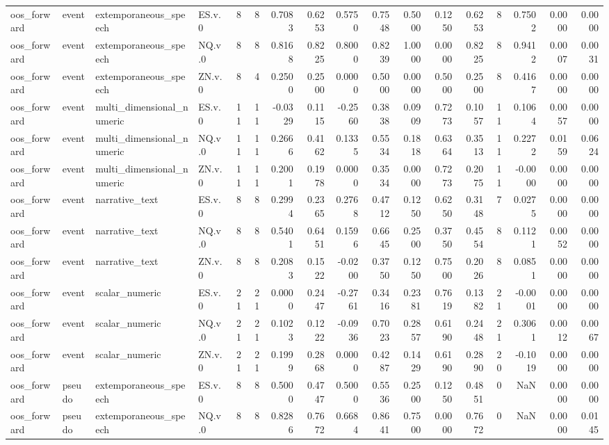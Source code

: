 \begin{tabular}{llllrrrrrrrrrrrrr}
oos_forward & event & extemporaneous_speech & ES.v.0 & 8 & 8 & 0.7083 & 0.6253 & 0.5750 & 0.7548 & 0.5000 & 0.1250 & 0.6253 & 8 & 0.7502 & 0.0000 & 0.0000 \\
oos_forward & event & extemporaneous_speech & NQ.v.0 & 8 & 8 & 0.8168 & 0.8225 & 0.8000 & 0.8239 & 1.0000 & 0.0000 & 0.8225 & 8 & 0.9412 & 0.0007 & 0.0031 \\
oos_forward & event & extemporaneous_speech & ZN.v.0 & 8 & 4 & 0.2500 & 0.2500 & 0.0000 & 0.5000 & 0.0000 & 0.5000 & 0.2500 & 8 & 0.4167 & 0.0000 & 0.0000 \\
oos_forward & event & multi_dimensional_numeric & ES.v.0 & 11 & 11 & -0.0329 & 0.1115 & -0.2560 & 0.3838 & 0.0909 & 0.7273 & 0.1057 & 11 & 0.1064 & 0.0057 & 0.0000 \\
oos_forward & event & multi_dimensional_numeric & NQ.v.0 & 11 & 11 & 0.2666 & 0.4162 & 0.1335 & 0.5534 & 0.1818 & 0.6364 & 0.3513 & 11 & 0.2272 & 0.0159 & 0.0624 \\
oos_forward & event & multi_dimensional_numeric & ZN.v.0 & 11 & 11 & 0.2001 & 0.1978 & 0.0000 & 0.3534 & 0.0000 & 0.7273 & 0.2075 & 11 & -0.0000 & 0.0000 & 0.0000 \\
oos_forward & event & narrative_text & ES.v.0 & 8 & 8 & 0.2994 & 0.2365 & 0.2768 & 0.4712 & 0.1250 & 0.6250 & 0.3148 & 7 & 0.0275 & 0.0000 & 0.0000 \\
oos_forward & event & narrative_text & NQ.v.0 & 8 & 8 & 0.5401 & 0.6451 & 0.1596 & 0.6645 & 0.2500 & 0.3750 & 0.4554 & 8 & 0.1121 & 0.0052 & 0.0000 \\
oos_forward & event & narrative_text & ZN.v.0 & 8 & 8 & 0.2083 & 0.1522 & -0.0200 & 0.3750 & 0.1250 & 0.7500 & 0.2026 & 8 & 0.0851 & 0.0000 & 0.0000 \\
oos_forward & event & scalar_numeric & ES.v.0 & 21 & 21 & 0.0000 & 0.2447 & -0.2761 & 0.3416 & 0.2381 & 0.7619 & 0.1382 & 21 & -0.0001 & 0.0000 & 0.0000 \\
oos_forward & event & scalar_numeric & NQ.v.0 & 21 & 21 & 0.1023 & 0.1222 & -0.0936 & 0.7023 & 0.2857 & 0.6190 & 0.2448 & 21 & 0.3061 & 0.0012 & 0.0067 \\
oos_forward & event & scalar_numeric & ZN.v.0 & 21 & 21 & 0.1999 & 0.2868 & 0.0000 & 0.4287 & 0.1429 & 0.6190 & 0.2890 & 20 & -0.1019 & 0.0000 & 0.0000 \\
oos_forward & pseudo & extemporaneous_speech & ES.v.0 & 8 & 8 & 0.5000 & 0.4747 & 0.5000 & 0.5536 & 0.2500 & 0.1250 & 0.4851 & 0 & NaN & 0.0000 & 0.0000 \\
oos_forward & pseudo & extemporaneous_speech & NQ.v.0 & 8 & 8 & 0.8286 & 0.7672 & 0.6684 & 0.8641 & 0.7500 & 0.0000 & 0.7672 & 0 & NaN & 0.0000 & 0.0145 \\

\end{tabular}
